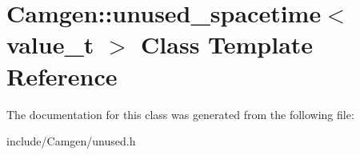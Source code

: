 \hypertarget{a00576}{}\section{Camgen\+:\+:unused\+\_\+spacetime$<$ value\+\_\+t $>$ Class Template Reference}
\label{a00576}


The documentation for this class was generated from the following file\+:\begin{DoxyCompactItemize}
\item 
include/\+Camgen/unused.\+h\end{DoxyCompactItemize}
